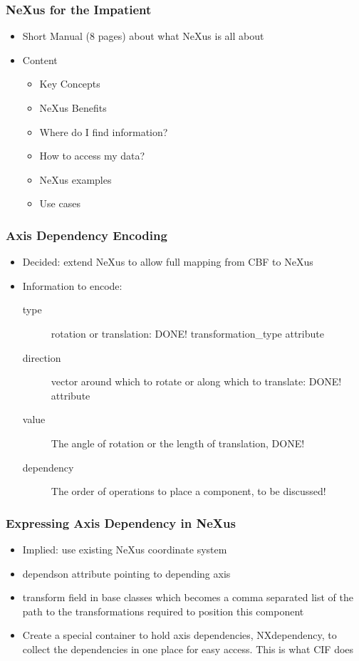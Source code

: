 \documentclass{beamer}
\begin{document}
\begin{frame}
\frametitle{NeXus for the Impatient}
\begin{itemize}
\item Short Manual (8 pages) about what NeXus is all about
\item Content
\begin{itemize}
\item Key Concepts
\item NeXus Benefits
\item Where do I find information?
\item How to access my data?
\item NeXus examples
\item Use cases
\end{itemize}
\end{itemize}
\end{frame}


\begin{frame} \frametitle{Axis Dependency Encoding}
\begin{itemize}
\item Decided: extend NeXus to allow full mapping from CBF to NeXus
\item Information to encode:
\begin{description}
\item[type] rotation or translation: DONE! transformation\_type attribute
\item[direction] vector around which to rotate or along which to translate: DONE! attribute
\item[value] The angle of rotation or the length of translation, DONE!
\item[dependency] The order of operations to place a component, to be discussed!
\end{description}
\end{itemize}
\end{frame}


\begin{frame} \frametitle{Expressing Axis Dependency in NeXus}
\begin{itemize}
\item Implied: use existing NeXus coordinate system
\item dependson attribute pointing to depending axis
\item transform field in base classes which becomes a comma separated list of 
 the path to the transformations required to position this component
\item Create a special container to hold axis dependencies, NXdependency, to 
 collect the dependencies in one place for easy access. This is what CIF does
\end{itemize}
\end{frame}
\end{document}
